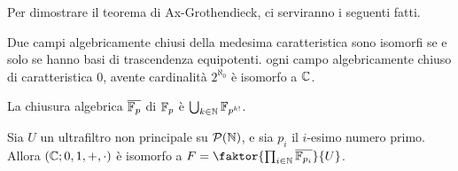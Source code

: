 Per dimostrare il teorema di Ax-Grothendieck, ci serviranno i seguenti fatti.

\begin{fact}
    Due campi algebricamente chiusi della medesima caratteristica sono isomorfi se e solo se hanno basi di trascendenza equipotenti.  ogni
    campo algebricamente chiuso di caratteristica 0, avente cardinalità $2^{\aleph_0}$ è isomorfo a $\mathbb C$.
\end{fact}

\begin{fact}
    La chiusura algebrica $\overline{\mathbb F_p}$ di $\mathbb F_p$ è $\bigcup_{k\in \mathbb N}\mathbb F_{p^{k!}}$.
\end{fact}

\begin{lemma} 
    Sia $U$ un ultrafiltro non principale su $\mathcal{P}(\mathbb N)$, e sia $p_i$ il $i$-esimo numero primo. Allora $(\mathbb C;0,1,+,\cdot)$ è isomorfo a $F = \faktor{\prod_{i \in \NN}\overline{\FF_{p_i}}}{U}$.
\end{lemma}

